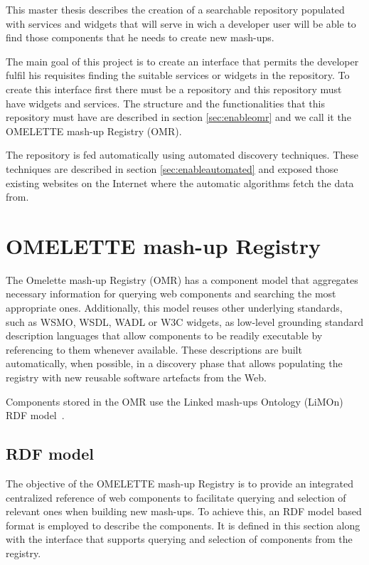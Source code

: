 This master thesis describes the creation of a searchable repository populated with services and widgets that will serve in wich a developer user will be able to find those components that he needs to create new mash-ups.

The main goal of this project is to create an interface that permits the developer fulfil his requisites finding the suitable services or widgets in the repository. To create this interface first there must be a repository and this repository must have widgets and services. The structure and the functionalities that this repository must have are described in section \ref{sec:enableomr} and we call it the OMELETTE mash-up Registry (OMR).

The repository is fed automatically using automated discovery techniques. These techniques are described in section \ref{sec:enableautomated} and exposed those existing websites on the Internet where the automatic algorithms fetch the data from.

\section{OMELETTE mash-up Registry}
\label{sec:othercomponents}

The Omelette mash-up Registry (OMR) has a component model that aggregates necessary information for querying web components and searching the most appropriate ones. Additionally, this model reuses other underlying standards, such as WSMO, WSDL, WADL or W3C widgets, as low-level grounding standard description languages that allow components to be readily executable by referencing to them whenever available. These descriptions are built automatically, when possible, in a discovery phase that allows populating the registry with new reusable software artefacts from the Web.

Components stored in the OMR use the Linked mash-ups Ontology (LiMOn) RDF model~\cite{limon}.


\subsection{RDF model}
\label{subsec:rdfmodel}

The objective of the OMELETTE mash-up Registry is to provide an integrated centralized reference of web components to
facilitate querying and selection of relevant ones when building new mash-ups. To achieve this, an RDF model based format is employed to describe the components. It is defined in this section along with the interface that supports querying and selection of components from the registry.

